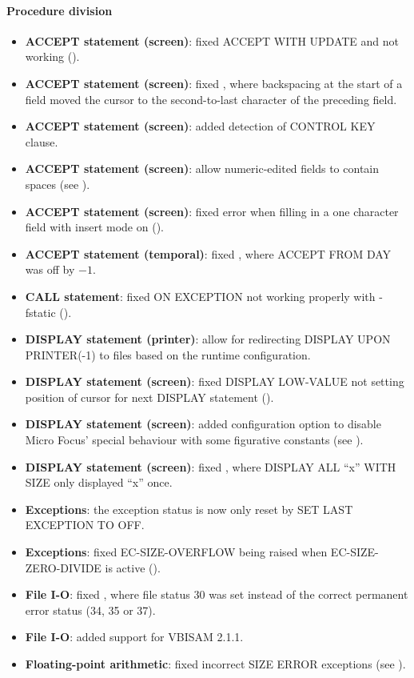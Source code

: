 \paragraph{Procedure division}
\begin{itemize}
\item \textbf{ACCEPT statement (screen)}: fixed ACCEPT WITH UPDATE and not working ().
\item \textbf{ACCEPT statement (screen)}: fixed , where backspacing at the start of a field moved the cursor to the second-to-last character of the preceding field.
\item \textbf{ACCEPT statement (screen)}: added detection of CONTROL KEY clause.
\item \textbf{ACCEPT statement (screen)}: allow numeric-edited fields to contain spaces (see ).
\item \textbf{ACCEPT statement (screen)}: fixed error when filling in a one character field with insert mode on ().
\item \textbf{ACCEPT statement (temporal)}: fixed , where ACCEPT FROM DAY was off by $-1$.
\item \textbf{CALL statement}: fixed ON EXCEPTION not working properly with -fstatic ().
\item \textbf{DISPLAY statement (printer)}: allow for redirecting DISPLAY UPON PRINTER(-1) to files based on the runtime configuration.
\item \textbf{DISPLAY statement (screen)}: fixed DISPLAY LOW-VALUE not setting position of cursor for next DISPLAY statement ().
\item \textbf{DISPLAY statement (screen)}: added configuration option to disable Micro Focus' special behaviour with some figurative constants (see ).
\item \textbf{DISPLAY statement (screen)}: fixed , where DISPLAY ALL ``x'' WITH SIZE only displayed ``x'' once.
\item \textbf{Exceptions}: the exception status is now only reset by SET LAST EXCEPTION TO OFF.
\item \textbf{Exceptions}: fixed EC-SIZE-OVERFLOW being raised when EC-SIZE-ZERO-DIVIDE is active ().
\item \textbf{File I-O}: fixed , where file status 30 was set instead of the correct permanent error status (34, 35 or 37).
\item \textbf{File I-O}: added support for VBISAM 2.1.1.
\item \textbf{Floating-point arithmetic}: fixed incorrect SIZE ERROR exceptions (see ).

\end{itemize}
